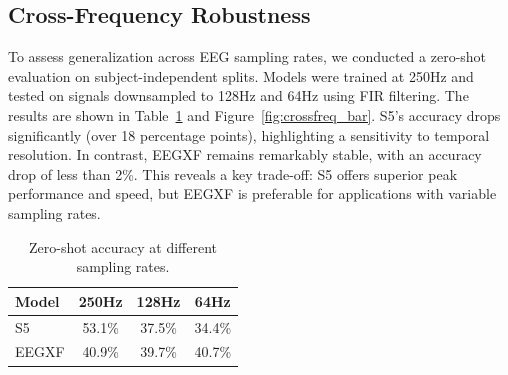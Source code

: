 \documentclass{article}
\newcommand{\eegtrans}{EEGXF}
\begin{document}



\subsection{Cross-Frequency Robustness}
To assess generalization across EEG sampling rates, we conducted a zero-shot evaluation on subject-independent splits. Models were trained at 250Hz and tested on signals downsampled to 128Hz and 64Hz using FIR filtering. The results are shown in Table~\ref{tab:crossfreq} and Figure~\ref{fig:crossfreq_bar}. S5's accuracy drops significantly (over 18 percentage points), highlighting a sensitivity to temporal resolution. In contrast, \eegtrans{} remains remarkably stable, with an accuracy drop of less than 2\%. This reveals a key trade-off: S5 offers superior peak performance and speed, but \eegtrans{} is preferable for applications with variable sampling rates.

\begin{table}[h]
\centering
\caption{Zero-shot accuracy at different sampling rates.}
\label{tab:crossfreq}
\begin{tabular}{lccc}
\toprule
\textbf{Model} & \textbf{250Hz} & \textbf{128Hz} & \textbf{64Hz} \\
\midrule
S5 & 53.1\% & 37.5\% & 34.4\% \\
\eegtrans & 40.9\% & 39.7\% & 40.7\% \\
\bottomrule
\end{tabular}
\end{table}
\end{document}
